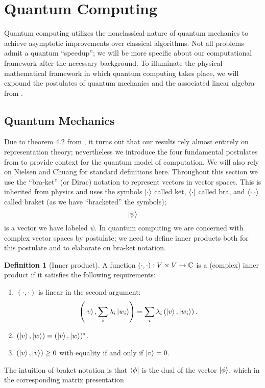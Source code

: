 \documentclass[12pt,twoside]{reedthesis}
\theoremstyle{plain}   %
\theoremstyle{definition}
\newtheorem{defn}{Definition}[section]
\theoremstyle{remark}
\numberwithin{equation}{section}
\begin{document}
  \section{Quantum Computing}
  Quantum computing utilizes the nonclassical nature of quantum mechanics to achieve asymptotic improvements over classical algorithms.
  Not all problems admit a quantum ``speedup''; we will be more specific about our computational framework after the necessary background.
  To illuminate the physical-mathematical framework in which quantum computing takes place, we will expound the postulates of quantum mechanics and the associated linear algebra from \cite[Chapter 2]{nielsen2010}.
  \subsection{Quantum Mechanics}
  Due to theorem 4.2 from \cite{copeland}, it turns out that our results rely almost entirely on representation theory;
  nevertheless we introduce the four fundamental postulates from \cite[Chapter 2]{nielsen2010} to provide context for the quantum model of computation. We will also rely on Nielsen and Chuang for standard definitions here.
  Throughout this section we use the ``bra-ket'' (or Dirac) notation to represent vectors in vector spaces. This is inherited from physics and uses the symbols
  $\ket{\cdot}$ called ket, $\bra{\cdot}$ called bra, and $\braket{\cdot | \cdot}$ called braket (as we have ``bracketed'' the symbols); 
  \[ \ket{\psi} \]
  is a vector we have labeled $\psi$. In quantum computing we are concerned with complex vector spaces by postulate; we need to define inner products both for this postulate and to elaborate on bra-ket notation.
  \begin{defn}[{Inner product}]
    A function $(\cdot, \cdot): V \times V \to \mathbb{C}$ is a (complex) inner product if it satisfies the following requirements:
    \begin{enumerate}
    \item $(\cdot, \cdot)$ is linear in the second argument:
      \[ \left( \ket{v}, \sum_i \lambda_i \ket{w_i} \right) = \sum_i \lambda_i \left( \ket{v}, \ket{w_i} \right).\]
    \item $(\ket{v}, \ket{w}) = (\ket{v}, \ket{w})^*$.
    \item $(\ket{v}, \ket{v}) \geq 0$ with equality if and only if $\ket{v} = 0$.
    \end{enumerate}
  \end{defn}
  The intuition of braket notation is that $\bra{\phi}$ is the dual of the vector $\ket{\phi}$, which in the corresponding matrix presentation
\end{document}
